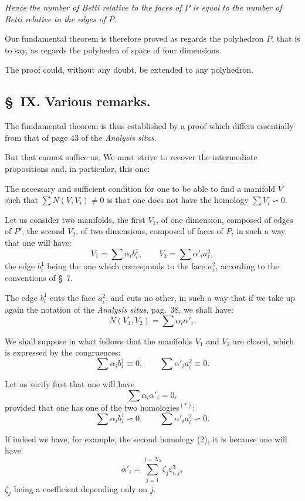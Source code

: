 \documentclass{article}
\begin{document}
\emph{Hence the number of Betti relative to the faces of $P$ is equal to the number of Betti relative to the edges of $P$}.

Our fundamental theorem is therefore proved as regards the polyhedron $P$, that is to say, as regards the polyhedra of space of four dimensions.

The proof could, without any doubt, be extended to any polyhedron.

\subsection*{\S~IX. Various remarks.}

The fundamental theorem is thus established by a proof which differs essentially from that of page 43 of the \emph{Analysis situs}.

But that cannot suffice us. We must strive to recover the intermediate propositions and, in particular, this one:

The necessary and sufficient condition for one to be able to find a manifold $V$ such that $\displaystyle\sum N(V, V_{i}) \neq 0$ is that one does not have the homology $\displaystyle\sum V_{i} \backsim 0$.

Let us consider two manifolds, the first $V_{1}$, of one dimension, composed of edges of $P'$, the second $V_{2}$, of two dimensions, composed of faces of $P$, in such a way that one will have:
\[ V_{1} = \sum \alpha_{i} b^{1}_{i}, \qquad V_{2} = \sum \alpha'_{i} a^{2}_{i}, \]
the edge $b^{1}_{i}$ being the one which corresponds to the face $a^{2}_{i}$, according to the conventions of \S~7.

The edge $b^{1}_{i}$ cuts the face $a^{2}_{i}$, and cuts no other, in such a way that if we take up again the notation of the \emph{Analysis situs}, pag.\ 38, we shall have:
\[ N(V_{1}, V_{2}) = \sum \alpha_{i} \alpha'_{i}. \]

We shall suppose in what follows that the manifolds $V_{1}$ and
$V_{2}$ are closed, which is expressed by the congruences:
\[ \sum \alpha_{i} b^{1}_{i} \equiv 0, \qquad \sum \alpha'_{i} a^{2}_{i} \equiv 0. \tag{1} \]

Let us verify first that one will have
\[ \sum \alpha_{i} \alpha'_{i} = 0, \]
provided that one has one of the two homologies${}^{(*)}$:
\[ \sum \alpha_{i} b^{1}_{i} \backsim 0, \qquad \sum \alpha'_{i} a^{2}_{i} \backsim 0. \tag{2} \]

If indeed we have, for example, the second homology (2), it is because one will have:
\[ \alpha'_{i} = \sum_{j=1}^{j=N_{3}} \zeta_{j} \varepsilon^{3}_{i,j}, \]
$\zeta_{j}$ being a coefficient depending only on $j$.
\end{document}
